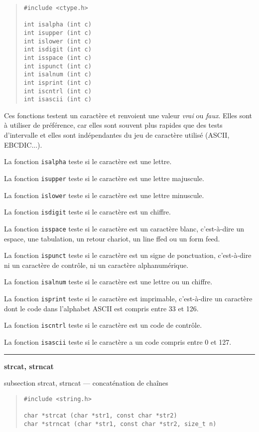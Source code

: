 \documentclass [twoside] {report}
\newcommand {\primitive} [1]
    {
	\phantomsection
	{\large \bf #1}
	\addcontentsline {toc} {subsection} {#1}
    }
\newcommand {\separation}
    {
	\vspace {5mm}
	\nopagebreak
	\hrule
    }
\begin{document}
\begin {quote}
\begin {verbatim}
#include <ctype.h>

int isalpha (int c)
int isupper (int c)
int islower (int c)
int isdigit (int c)
int isspace (int c)
int ispunct (int c)
int isalnum (int c)
int isprint (int c)
int iscntrl (int c)
int isascii (int c)
\end{verbatim}
\end {quote}

Ces fonctions testent un caractère et renvoient une valeur
{\em vrai} ou {\em faux}. Elles sont à utiliser de préférence, car
elles sont souvent plus rapides que des tests d'intervalle
et elles sont indépendantes du jeu de caractère utilisé
(ASCII, EBCDIC...).

La fonction {\tt isalpha} teste si le caractère est une
lettre.

La fonction {\tt isupper} teste si le caractère est une
lettre majuscule.

La fonction {\tt islower} teste si le caractère est une
lettre minuscule.

La fonction {\tt isdigit} teste si le caractère est un
chiffre.

La fonction {\tt isspace} teste si le caractère est un
caractère blanc, c'est-à-dire un espace, une tabulation, un
retour chariot, un line ffed ou un form feed.

La fonction {\tt ispunct} teste si le caractère est un
signe de ponctuation, c'est-à-dire ni un caractère de
contrôle, ni un caractère alphanumérique.

La fonction {\tt isalnum} teste si le caractère est une
lettre ou un chiffre.

La fonction {\tt isprint} teste si le caractère est
imprimable, c'est-à-dire un caractère dont le code dans
l'alphabet ASCII est compris entre 33 et 126.

La fonction {\tt iscntrl} teste si le caractère est un
code de contrôle.

La fonction {\tt isascii} teste si le caractère a un code
compris entre 0 et 127.


\separation 
\primitive {strcat, strncat} --- concaténation de chaînes

\begin {quote}
\begin {verbatim}
#include <string.h>

char *strcat (char *str1, const char *str2)
char *strncat (char *str1, const char *str2, size_t n)
\end{verbatim}
\end {quote}
\end{document}
